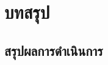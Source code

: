 \documentclass[11pt,a4paper]{article}
\begin{document}

\section{บทสรุป}
\subsection{สรุปผลการดำเนินการ}
\end{document}
